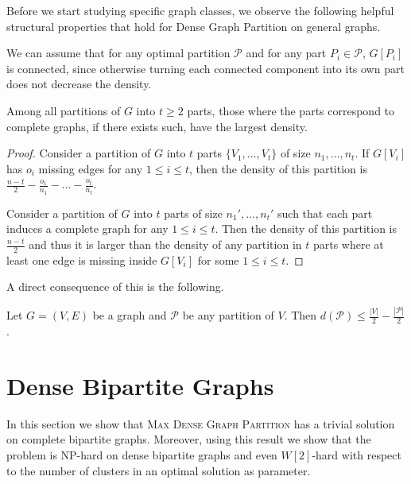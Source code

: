 \documentclass[a4paper,USenglish,cleveref, autoref]{lipics-v2021}
\newcommand\MDGP{\textsc{Max Dense Graph Partition}}
\begin{document}
Before we start studying specific graph classes, we observe the following helpful structural properties that hold for {\sc Dense Graph Partition} on general graphs.
\begin{remark*}\label{remarkconnexe}
 We can assume that for any optimal partition  $\mathcal{P}$ and for any part $P_i \in \mathcal{P}$, $G[P_i]$ is connected, since otherwise turning each connected  component into its own part does not decrease the density.
\end{remark*}

 \begin{lemma}\label{lemmacomplete}
   Among all partitions of $G$ into $t\geq 2$ parts, those where the parts correspond to complete graphs, if there exists such,  have the largest density. 
 \end{lemma}
 \begin{proof}
Consider a partition of $G$ into $t$ parts $\{V_1,\ldots,V_t\}$ of size $n_1,\ldots,n_t$.  If $G[V_i]$ has $o_i$ missing edges for any $1\leq i\leq t$, then the density of this partition is $\frac{n-t}{2}- \frac{o_1}{n_1}-\ldots -\frac{o_t}{n_t}$. 

Consider a partition of $G$ into $t$ parts   of size $n_1',\ldots,n_t'$ such that each part induces a  complete graph for any $1\leq i\leq t$. Then the density of this partition is $\frac{n-t}{2}$ and thus it is larger than the density of any partition in  $t$ parts where at least one edge is missing inside $G[V_i]$ for some $1\leq i\leq t$.
\end{proof}
A direct consequence of this is the following.
\begin{lemma}
\label{lem:densMax}
Let  $G = (V,E)$ be a graph and $\mathcal{P}$ be any partition of $V$. Then $d(\mathcal{P}) \leq \frac{|V|}{2} - \frac{|\mathcal{P}|}{2}$.
\end{lemma}


\section{Dense Bipartite Graphs}\label{sec3}
\label{sec:bipartiDense}
In this section we show that \MDGP{} has a trivial solution on complete bipartite graphs.  Moreover, using this result we  show that the problem is NP-hard on dense bipartite graphs and even $W[2]$-hard with respect to the number of clusters in an optimal solution as parameter. 
\end{document}

